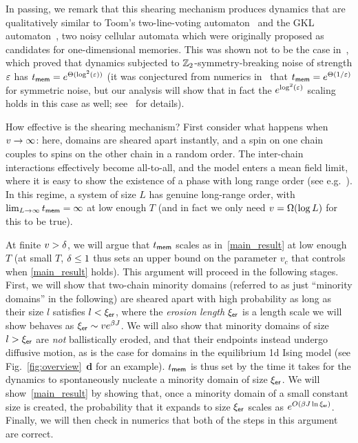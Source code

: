 \documentclass[prl,aps,twocolumn,groupedaddress,superscriptaddress,preprintnumbers,nobibnotes]{revtex4-2}
\newcommand{\tmem}{{t_{\sf mem}}}
\newcommand{\ler}{{\xi_{\sf er}}} %
\begin{document}
	In passing, we remark that this shearing mechanism produces dynamics that are qualitatively similar to Toom's two-line-voting automaton~\cite{toom1995cellular,park1997ergodicity} and the GKL automaton~\cite{gacs1978one}, two noisy cellular automata which were originally proposed as candidates for one-dimensional memories. This was shown not to be the case in~\cite{park1997ergodicity}, which proved that dynamics subjected to $\mathbb{Z}_2 $-symmetry-breaking noise of strength $\varepsilon$ has $\tmem = e^{\ct(\log^2(\ep))}$ (it was conjectured from numerics in~\cite{de1992gacs} that $\tmem = e^{\ct(1/\ep)}$ for symmetric noise, but our analysis will show that in fact the $e^{\log^2(\varepsilon)}$ scaling holds in this case as well; see~\cite{code} for details).
	
	How effective is the shearing mechanism? First consider what happens when $v \rightarrow \infty$: here, domains are sheared apart instantly, and a spin on one chain couples to spins on the other chain in a random order. 
	The inter-chain interactions effectively become all-to-all, and the model enters a mean field limit, where it is easy to show the existence of a phase with long range order (see e.g.~\cite{kadau2008magnetic,hucht2009nonequilibrium}). In this regime, a system of size $L$ has genuine long-range order, with $\lim_{L \ra\infty}\tmem = \infty$ at low enough $T$ (and in fact we only need $v = \Omega(\log L)$ for this to be true). 
	
	At finite $v>\delta$, we will argue that $\tmem$ scales as in~\eqref{main_result} at low enough $T$ (at small $T$, $\delta\leq1$ thus sets an upper bound on the parameter $v_c$ that controls  when \eqref{main_result} holds). This argument will proceed in the following stages. First, we will show that two-chain minority domains (referred to as just ``minority domains'' in the following) are sheared apart with high probability as long as their size $l$ satisfies $l < \ler$, where the {\it erosion length} $\ler$ is a length scale we will show behaves as $\ler \sim v e^{\b J}$. We will also show that minority domains of size $l > \ler$ are {\it not} ballistically eroded, and that their endpoints instead undergo diffusive motion, as is the case for domains in the equilibrium 1d Ising model (see Fig.~\ref{fig:overview}~{\bf d} for an example). $\tmem$ is thus set by the time it takes for the dynamics to spontaneously nucleate a minority domain of size $\ler$. We will show~\eqref{main_result} by showing that, once a minority domain of a small constant size is created, the probability that it expands to size $\ler$ scales as $e^{O(\b J \ln \ler )}$. Finally, we will then check in numerics that both of the steps in this argument are correct. 
	
\end{document}
